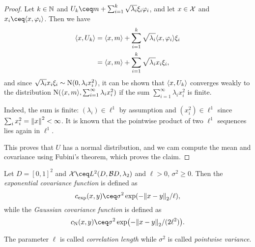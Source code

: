 \begin{proof}
	Let $k \in \mathbb N$ and $U_k \ceq m + \sum_{i=1}^k \sqrt{\lambda_i} \xi_i \phi_i$, and let $x \in \mathcal X$ and $x_i \ceq \ang{x, \phi_i}$. Then we have 
	\begin{align*}
		\langle x, U_k\rangle &= \langle x, m\rangle + \sum_{i=1}^k \sqrt{\lambda_i} \langle x, \varphi_i\rangle \xi_i \\
		&= \langle x, m\rangle + \sum_{i=1}^k \sqrt{\lambda_i} x_i \xi_i, 
	\end{align*}
and since $\sqrt{\lambda_i}x_i\xi_i \sim \mathrm N(0, \lambda_i x_i^2)$, it can be shown that $\langle x, U_k\rangle$ converges weakly to the distribution $\mathrm N(\langle x, m\rangle, \sum_{i=1}^\infty \lambda_i x_i^2)$ if the sum $\sum_{i=1}^\infty \lambda_ix_i^2$ is finite. 

Indeed, the sum is finite: $(\lambda_i) \in \ell^1$ by assumption and $(x_i^2) \in \ell^1$ since $\sum_i x_i^2 = \norm{x}^2 < \infty$. It is known that the pointwise product of two $\ell^1$ sequences lies again in $\ell^1$. 

This proves that $U$ has a normal distribution, and we cam compute the mean and covariance  using Fubini's theorem, which proves the claim. 
\end{proof}

\begin{example}
	Let $D = [0, 1]^2$ and $\XX \ceq L^2(D, \BB D, \lambda_2)$ and $\ell > 0$, $\sigma^2 \geq 0$. Then the \emph{exponential covariance function} is defined as
	\[
	c_\Rm{exp}(x, y) \ceq \sigma^2\exp(-\norm{x - y}_2 / \ell),
	\]
	while the \emph{Gaussian covariance function} is defined as
	\[
	c_\Rm{N}(x, y) \ceq \sigma^2 \exp(- \norm{x - y}_2 / (2\ell^2)). 
	\]
	
	The parameter $\ell$ is called \emph{correlation length} while $\sigma^2$ is called \emph{pointwise variance}. 
\end{example}